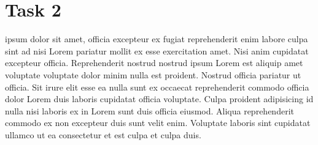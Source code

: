 \documentclass[11pt]{article}
\begin{document}
\section{Task 2}
\Lorem ipsum dolor sit amet, officia excepteur ex fugiat reprehenderit enim
labore culpa sint ad nisi Lorem pariatur mollit ex esse exercitation amet. Nisi
anim cupidatat excepteur officia. Reprehenderit nostrud nostrud ipsum Lorem est
aliquip amet voluptate voluptate dolor minim nulla est proident. Nostrud
officia pariatur ut officia. Sit irure elit esse ea nulla sunt ex occaecat
reprehenderit commodo officia dolor Lorem duis laboris cupidatat officia
voluptate. Culpa proident adipisicing id nulla nisi laboris ex in Lorem sunt
duis officia eiusmod. Aliqua reprehenderit commodo ex non excepteur duis sunt
velit enim. Voluptate laboris sint cupidatat ullamco ut ea consectetur et est
culpa et culpa duis.
\end{document}
